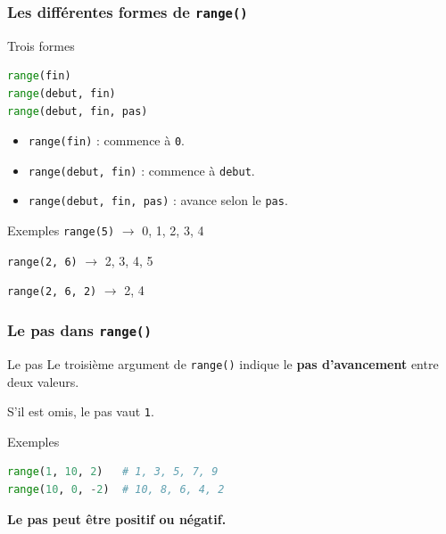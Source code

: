 \documentclass[10pt]{beamer}
\begin{document}
\begin{frame}[containsverbatim]
	\frametitle{Les différentes formes de \texttt{range()}}
	\begin{alertblock}{Trois formes}
\begin{lstlisting}[language=Python]
range(fin)
range(debut, fin)
range(debut, fin, pas)
\end{lstlisting}
	\end{alertblock}
	

	\vspace{0.1cm}
	
	\begin{itemize}
		\item \texttt{range(fin)} : commence à \texttt{0}.
		\item \texttt{range(debut, fin)} : commence à \texttt{debut}.
		\item \texttt{range(debut, fin, pas)} : avance selon le \texttt{pas}.
	\end{itemize}
	
	\vspace{0.1cm}
	
	\begin{exampleblock}{Exemples}
		\centering
		\texttt{range(5)} $\rightarrow$ 0, 1, 2, 3, 4
		
		\vspace{0.05cm}
		
		\texttt{range(2, 6)} $\rightarrow$ 2, 3, 4, 5
		
		\vspace{0.05cm}
		\texttt{range(2, 6, 2)} $\rightarrow$ 2, 4 

	\end{exampleblock}
\end{frame}
\begin{frame}[containsverbatim]
	\frametitle{Le pas dans \texttt{range()}}
	
	\begin{block}{Le pas}
		Le troisième argument de \texttt{range()} indique
		le \textbf{pas d'avancement} entre deux valeurs.
		
		\vspace{0.05cm}
		
		S'il est omis, le pas vaut \texttt{1}.
	\end{block}
	
	\vspace{0.15cm}
	
\begin{exampleblock}{Exemples}
\begin{lstlisting}[language=Python]
range(1, 10, 2)   # 1, 3, 5, 7, 9
range(10, 0, -2)  # 10, 8, 6, 4, 2
\end{lstlisting}
\end{exampleblock}
	

	\vspace{0.1cm}
	
	\centering
	\textbf{Le pas peut être positif ou négatif.}
	
\end{frame}
\end{document}
